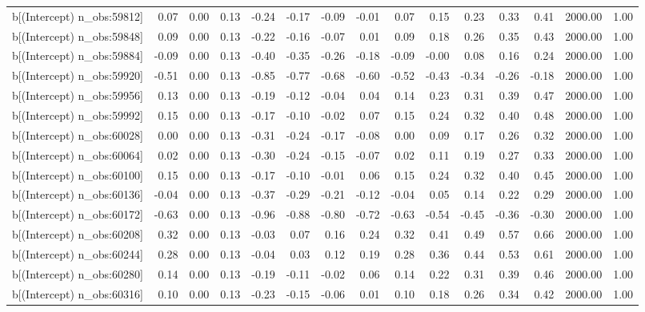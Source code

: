 \begin{table}[ht]
\begin{tabular}{rrrrrrrrrrrrrrr}
  b[(Intercept) n\_obs:59812] & 0.07 & 0.00 & 0.13 & -0.24 & -0.17 & -0.09 & -0.01 & 0.07 & 0.15 & 0.23 & 0.33 & 0.41 & 2000.00 & 1.00 \\ 
  b[(Intercept) n\_obs:59848] & 0.09 & 0.00 & 0.13 & -0.22 & -0.16 & -0.07 & 0.01 & 0.09 & 0.18 & 0.26 & 0.35 & 0.43 & 2000.00 & 1.00 \\ 
  b[(Intercept) n\_obs:59884] & -0.09 & 0.00 & 0.13 & -0.40 & -0.35 & -0.26 & -0.18 & -0.09 & -0.00 & 0.08 & 0.16 & 0.24 & 2000.00 & 1.00 \\ 
  b[(Intercept) n\_obs:59920] & -0.51 & 0.00 & 0.13 & -0.85 & -0.77 & -0.68 & -0.60 & -0.52 & -0.43 & -0.34 & -0.26 & -0.18 & 2000.00 & 1.00 \\ 
  b[(Intercept) n\_obs:59956] & 0.13 & 0.00 & 0.13 & -0.19 & -0.12 & -0.04 & 0.04 & 0.14 & 0.23 & 0.31 & 0.39 & 0.47 & 2000.00 & 1.00 \\ 
  b[(Intercept) n\_obs:59992] & 0.15 & 0.00 & 0.13 & -0.17 & -0.10 & -0.02 & 0.07 & 0.15 & 0.24 & 0.32 & 0.40 & 0.48 & 2000.00 & 1.00 \\ 
  b[(Intercept) n\_obs:60028] & 0.00 & 0.00 & 0.13 & -0.31 & -0.24 & -0.17 & -0.08 & 0.00 & 0.09 & 0.17 & 0.26 & 0.32 & 2000.00 & 1.00 \\ 
  b[(Intercept) n\_obs:60064] & 0.02 & 0.00 & 0.13 & -0.30 & -0.24 & -0.15 & -0.07 & 0.02 & 0.11 & 0.19 & 0.27 & 0.33 & 2000.00 & 1.00 \\ 
  b[(Intercept) n\_obs:60100] & 0.15 & 0.00 & 0.13 & -0.17 & -0.10 & -0.01 & 0.06 & 0.15 & 0.24 & 0.32 & 0.40 & 0.45 & 2000.00 & 1.00 \\ 
  b[(Intercept) n\_obs:60136] & -0.04 & 0.00 & 0.13 & -0.37 & -0.29 & -0.21 & -0.12 & -0.04 & 0.05 & 0.14 & 0.22 & 0.29 & 2000.00 & 1.00 \\ 
  b[(Intercept) n\_obs:60172] & -0.63 & 0.00 & 0.13 & -0.96 & -0.88 & -0.80 & -0.72 & -0.63 & -0.54 & -0.45 & -0.36 & -0.30 & 2000.00 & 1.00 \\ 
  b[(Intercept) n\_obs:60208] & 0.32 & 0.00 & 0.13 & -0.03 & 0.07 & 0.16 & 0.24 & 0.32 & 0.41 & 0.49 & 0.57 & 0.66 & 2000.00 & 1.00 \\ 
  b[(Intercept) n\_obs:60244] & 0.28 & 0.00 & 0.13 & -0.04 & 0.03 & 0.12 & 0.19 & 0.28 & 0.36 & 0.44 & 0.53 & 0.61 & 2000.00 & 1.00 \\ 
  b[(Intercept) n\_obs:60280] & 0.14 & 0.00 & 0.13 & -0.19 & -0.11 & -0.02 & 0.06 & 0.14 & 0.22 & 0.31 & 0.39 & 0.46 & 2000.00 & 1.00 \\ 
  b[(Intercept) n\_obs:60316] & 0.10 & 0.00 & 0.13 & -0.23 & -0.15 & -0.06 & 0.01 & 0.10 & 0.18 & 0.26 & 0.34 & 0.42 & 2000.00 & 1.00 \\ 

\end{tabular}
\end{table}
